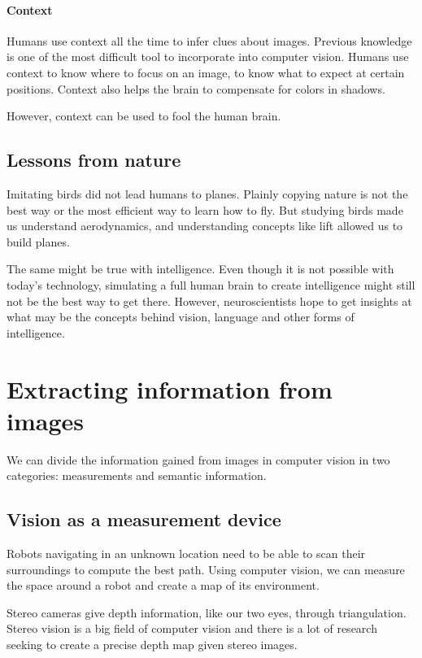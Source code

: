 \documentclass{article}
\begin{document}
\paragraph{Context}
Humans use context all the time to infer clues about images. Previous knowledge is one of the most difficult tool to incorporate into computer vision. Humans use context to know where to focus on an image, to know what to expect at certain positions. Context also helps the brain to compensate for colors in shadows.

However, context can be used to fool the human brain.

\subsection{Lessons from nature}
Imitating birds did not lead humans to planes. Plainly copying nature is not the best way or the most efficient way to learn how to fly. But studying birds made us understand aerodynamics, and understanding concepts like lift allowed us to build planes.

The same might be true with intelligence. Even though it is not possible with today's technology, simulating a full human brain to create intelligence might still not be the best way to get there. However, neuroscientists hope to get insights at what may be the concepts behind vision, language and other forms of intelligence.

\section{Extracting information from images}

We can divide the information gained from images in computer vision in two categories: measurements and semantic information.

\subsection{Vision as a measurement device}
Robots navigating in an unknown location need to be able to scan their surroundings to compute the best path. Using computer vision, we can measure the space around a robot and create a map of its environment.

Stereo cameras give depth information, like our two eyes, through triangulation. Stereo vision is a big field of computer vision and there is a lot of research seeking to create a precise depth map given stereo images.
\end{document}
